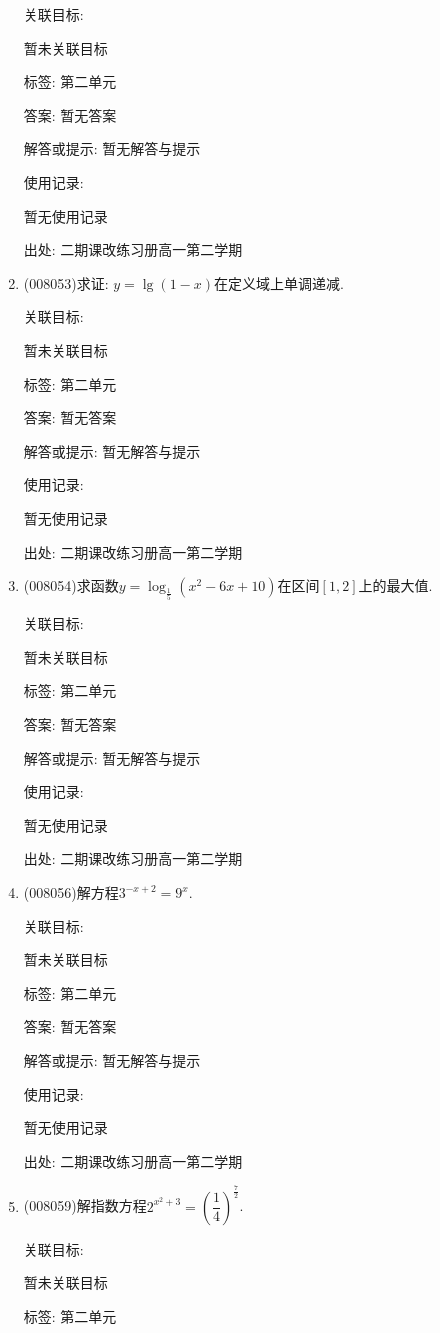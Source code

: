 \documentclass[10pt,a4paper]{article}
\begin{document}
\begin{enumerate}[1.]
关联目标:

暂未关联目标



标签: 第二单元

答案: 暂无答案

解答或提示: 暂无解答与提示

使用记录:

暂无使用记录


出处: 二期课改练习册高一第二学期
\item { (008053)}求证: $y=\lg(1-x)$在定义域上单调递减.


关联目标:

暂未关联目标



标签: 第二单元

答案: 暂无答案

解答或提示: 暂无解答与提示

使用记录:

暂无使用记录


出处: 二期课改练习册高一第二学期
\item { (008054)}求函数$y=\log _{\frac 15}(x^2-6x+10)$在区间$[1,2]$上的最大值.


关联目标:

暂未关联目标



标签: 第二单元

答案: 暂无答案

解答或提示: 暂无解答与提示

使用记录:

暂无使用记录


出处: 二期课改练习册高一第二学期
\item { (008056)}解方程$3^{-x+2}=9^x$.


关联目标:

暂未关联目标



标签: 第二单元

答案: 暂无答案

解答或提示: 暂无解答与提示

使用记录:

暂无使用记录


出处: 二期课改练习册高一第二学期
\item { (008059)}解指数方程$2^{x^2+3}=(\dfrac 14)^{\frac 72}$.


关联目标:

暂未关联目标



标签: 第二单元


\end{enumerate}
\end{document}
